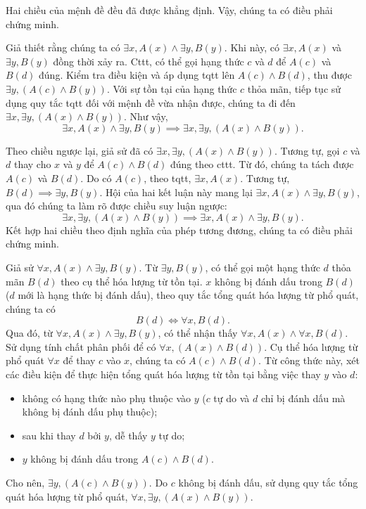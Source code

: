 Hai chiều của mệnh đề đều đã được khẳng định. Vậy, chúng ta có điều phải chứng minh.

\stepSubexercise Giả thiết rằng chúng ta có $\exists x, A(x) \land \exists y, B(y)$. Khi này, có $\exists x, A(x)$ và $\exists y, B(y)$ đồng thời xảy ra. Cttt, có thể gọi hạng thức $c$ và $d$ để $A(c)$ và $B(d)$ đúng. Kiểm tra điều kiện và áp dụng tqtt lên $A(c) \land B(d)$, thu được $\exists y, (A(c) \land B(y))$.
Với sự tồn tại của hạng thức $c$ thỏa mãn, tiếp tục sử dụng quy tắc tqtt đối với mệnh đề vừa nhận được, chúng ta đi đến $\exists x, \exists y, (A(x) \land B(y))$.
Như vậy,
\begin{equation*}
   \exists x, A(x) \land \exists y, B(y) \implies \exists x, \exists y, (A(x) \land B(y)).
\end{equation*}

Theo chiều ngược lại, giả sử đã có $\exists x, \exists y, (A(x) \land B(y))$. 
Tương tự, gọi $c$ và $d$ thay cho $x$ và $y$ để $A(c) \land B(d)$ đúng theo cttt. Từ đó, chúng ta tách được $A(c)$ và $B(d)$. Do có $A(c)$, theo tqtt, $\exists x, A(x)$. Tương tự, $B(d) \implies \exists y, B(y)$. 
Hội của hai kết luận này mang lại $\exists x, A(x) \land \exists y, B(y)$, qua đó chúng ta làm rõ được chiều suy luận ngược:
\begin{equation*}
    \exists x, \exists y, (A(x) \land B(y)) \implies \exists x, A(x) \land \exists y, B(y).
\end{equation*}
Kết hợp hai chiều theo định nghĩa của phép tương đương, chúng ta có điều phải chứng minh.

\stepSubexercise Giả sử $\forall x, A(x) \land \exists y, B(y)$. Từ $\exists y, B(y)$, có thể gọi một hạng thức $d$ thỏa mãn $B(d)$ theo cụ thể hóa lượng từ tồn tại. $x$ không bị đánh dấu trong $B(d)$ ($d$ mới là hạng thức bị đánh dấu), theo quy tắc tổng quát hóa lượng từ phổ quát, chúng ta có
$$B(d) \iff \forall x, B(d).$$
Qua đó, từ $\forall x, A(x) \land \exists y, B(y)$, có thể nhận thấy $\forall x, A(x) \land \forall x, B(d)$. Sử dụng tính chất phân phối để có $\forall x, (A(x) \land B(d))$. Cụ thể hóa lượng từ phổ quát $\forall x$ để thay $c$ vào $x$, chúng ta có $A(c) \land B(d)$. Từ công thức này, xét các điều kiện để thực hiện tổng quát hóa lượng từ tồn tại bằng việc thay $y$ vào $d$:
\begin{itemize}
   \item không có hạng thức nào phụ thuộc vào $y$ ($c$ tự do và $d$ chỉ bị đánh dấu mà không bị đánh dấu phụ thuộc);
   \item sau khi thay $d$ bởi $y$, dễ thấy $y$ tự do;
   \item $y$ không bị đánh dấu trong $A(c) \land B(d)$.
\end{itemize}
Cho nên, $\exists y, (A(c) \land B(y))$. Do $c$ không bị đánh dấu, sử dụng quy tắc tổng quát hóa lượng từ phổ quát, $\forall x, \exists y, (A(x) \land B(y))$.

